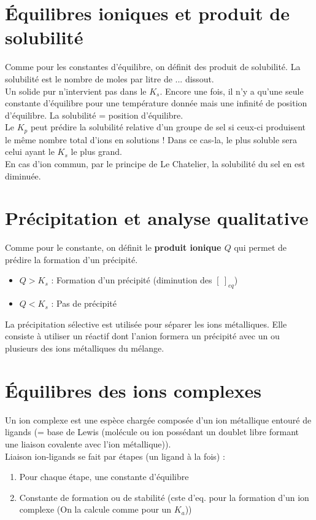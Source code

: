\documentclass[british,french,11pt, a4paper, openany]{book}
\begin{document}
\section{Équilibres ioniques et produit de solubilité}
Comme pour les constantes d'équilibre, on définit des produit de solubilité. La solubilité est le nombre de moles par litre de ... dissout.\\
Un solide pur n'intervient pas dans le $K_s$. Encore une fois, il n'y a qu'une seule constante d'équilibre pour une température donnée mais une infinité de position d'équilibre. La solubilité = position d'équilibre. \\

Le $K_p$ peut prédire la solubilité relative d'un groupe de sel si ceux-ci produisent le même nombre total d'ions en solutions ! Dans ce cas-la, le plus soluble sera celui ayant le $K_s$ le plus grand.\\

En cas d'ion commun, par le principe de Le Chatelier, la solubilité du sel en est diminuée. 

\section{Précipitation et analyse qualitative}
Comme pour le constante, on définit le \textbf{produit ionique $Q$} qui permet de prédire la formation d'un précipité.
\begin{itemize}
	\item $Q > K_s$ : Formation d'un précipité (diminution des $[\ ]_{eq}$)
	\item $Q < K_s$ : Pas de précipité
\end{itemize}
La précipitation sélective est utilisée pour séparer les ions métalliques. Elle consiste à utiliser un réactif dont l'anion formera un précipité avec un ou plusieurs des ions métalliques du mélange. 

\section{Équilibres des ions complexes}
Un ion complexe est une espèce chargée composée d'un ion métallique entouré de ligands (= base de Lewis (molécule ou ion possédant un doublet libre formant une liaison covalente avec l'ion métallique)).\\
Liaison ion-ligands se fait par étapes (un ligand à la fois) :
\begin{enumerate}
	\item Pour chaque étape, une constante d'équilibre
	\item Constante de formation ou de stabilité (cste d'eq. pour la formation d'un ion complexe (On la calcule comme pour un $K_a$))
\end{enumerate}
\end{document}
